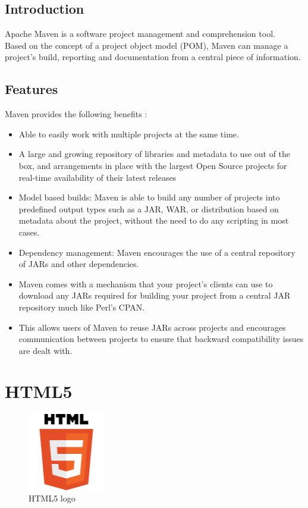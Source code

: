 \documentclass[12pt]{article}
\begin{document}
\subsection{Introduction}

Apache Maven is a software project management and comprehension tool.\\Based on the concept of a project object model (POM), Maven can manage a project's build, reporting and documentation from a central piece of information.\\

\subsection{Features}
Maven provides the following benefits :
\begin{itemize}
	\item Able to easily work with multiple projects at the same time.
	\item A large and growing repository of libraries and metadata to use out of the box, and arrangements in place with the largest Open Source projects for real-time availability of their latest releases
	\item Model based builds: Maven is able to build any number of projects into predefined output types such as a JAR, WAR, or distribution based on metadata about the project, without the need to do any scripting in most cases.
	\item Dependency management: Maven encourages the use of a central repository of JARs and other dependencies.
	\item Maven comes with a mechanism that your project's clients can use to download any JARs required for building your project from a central JAR repository much like Perl's CPAN.
	\item This allows users of Maven to reuse JARs across projects and encourages communication between projects to ensure that backward compatibility issues are dealt with.
\end{itemize}
\section{HTML5}
\begin{figure}[h]
	\centering
	\includegraphics[width=0.3\textwidth]{HTML5_logo.png}
	\caption{HTML5 logo}
\end{figure}
\end{document}
